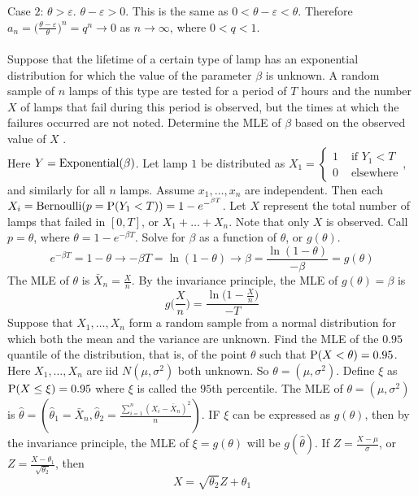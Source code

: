 \documentclass[12pt]{article}
\begin{document}
Case $2$: $\theta > \varepsilon$. $\theta - \varepsilon > 0$. This is the same as $0 < \theta - \varepsilon < \theta$. Therefore $a_n = \Big( \frac{\theta - \varepsilon}{\theta} \Big)^n = q^n \to 0$ as $n\to \infty$, where $0<q<1$. \\~\\
Suppose that the lifetime of a certain type of lamp has an exponential distribution for which the value of the parameter $\beta$ is unknown. A random sample of $n$ lamps of this type are tested for a period of $T$ hours and the number $X$ of lamps that fail during this period is observed, but the times at which the failures occurred are not noted. Determine the MLE of $\beta$ based on the observed value of $X$ .\\
Here $Y = \text{Exponential}( \beta )$. Let lamp $1$ be distributed as $X_1 = \begin{cases} 1 &\text{ if } Y_1 < T \\ 0 &\text{ elsewhere} \end{cases}$, and similarly for all $n$ lamps. Assume $x_1,\dots,x_n$ are independent. Then each $X_i = \text{Bernoulli}(p = \mathrm{P}( Y_1 < T )) = 1 - e^{-^{\beta T}}$. Let $X$ represent the total number of lamps that failed in $[0,T]$, or $X_1 + \dots + X_n$. Note that only $X$ is observed. Call $p = \theta$, where $\theta = 1 - e^{-\beta T}$. Solve for $\beta$ as a function of $\theta$, or $g(\theta)$. 
$$ e^{-\beta T} = 1 - \theta \to -\beta T = \ln(1-\theta) \to \beta = \frac{\ln(1-\theta)}{-\beta} = g(\theta)$$ 
The MLE of $\theta$ is $\bar{X}_n = \frac{X}{n}$. By the invariance principle, the MLE of $g(\theta) = \beta$ is $$ g\Big( \frac{X}{n} \Big) = \frac{\ln\Big(1 - \frac{X}{n}\Big)}{-T} $$ 
Suppose that $X_1,\dots,X_n$ form a random sample from a normal distribution for which both the mean and the variance are unknown. Find the MLE of the $0.95$ quantile of the distribution, that is, of the point $\theta$ such that $\mathrm{P}( X < \theta ) = 0.95$. \\
Here $X_1,\dots,X_n$ are iid $N(\mu, \sigma^2)$ both unknown. So $\theta = (\mu, \sigma^2)$. Define $\xi$ as $\mathrm{P}( X \leq \xi ) = 0.95$ where $\xi$ is called the $95$th percentile. The MLE of $\theta = (\mu,\sigma^2)$ is $\hat{\theta} = (\hat{\theta}_1 = \bar{X}_n, \hat{\theta}_2 = \frac{\sum_{i=1}^n (X_i - \bar{X}_n)^2}{n})$. IF $\xi$ can be expressed as $g(\theta)$, then by the invariance principle, the MLE of $\xi = g(\theta)$ will be $g(\hat{\theta})$. If $Z = \frac{X - \mu}{\sigma}$, or $Z = \frac{X - \theta_1}{\sqrt{\theta_2}}$, then $$X = \sqrt{\theta_2}Z + \theta_1$$ 
\end{document}
